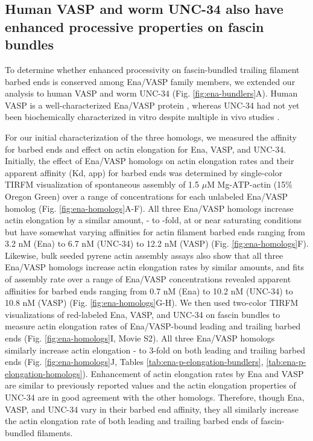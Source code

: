 \subsection{Human VASP and worm UNC-34 also have enhanced processive properties on fascin bundles}\label{vasp-unc34-processive}

To determine whether enhanced processivity on fascin-bundled trailing filament barbed ends is conserved among Ena/VASP family members, we extended our analysis to human VASP and worm UNC-34 (Fig. \ref{fig:ena-bundlers}A). Human VASP is a well-characterized Ena/VASP protein \citep{bachmann_evh2_1999,chereau_understanding_2006,breitsprecher_clustering_2008,pasic_ena/vasp_2008,hansen_vasp_2010}, whereas UNC-34 had not yet been biochemically characterized in vitro despite multiple in vivo studies \citep{sheffield_c._2007,fleming_role_2010,havrylenko_wave_2015}. 

For our initial characterization of the three homologs, we measured the affinity for barbed ends and effect on actin elongation for Ena, VASP, and UNC-34. Initially, the effect of Ena/VASP homologs on actin elongation rates and their apparent affinity (Kd, app) for barbed ends was determined by single-color TIRFM visualization of spontaneous assembly of 1.5 $\mu$M Mg-ATP-actin (15\% Oregon Green) over a range of concentrations for each unlabeled Ena/VASP homolog (Fig. \ref{fig:ena-homologs}A-F). All three Ena/VASP homologs increase actin elongation by a similar amount, - to -fold, at or near saturating conditions but have somewhat varying affinities for actin filament barbed ends ranging from 3.2 nM (Ena) to 6.7 nM (UNC-34) to 12.2 nM (VASP) (Fig. \ref{fig:ena-homologs}F). Likewise, bulk seeded pyrene actin assembly assays also show that all three Ena/VASP homologs increase actin elongation rates by similar amounts, and fits of assembly rate over a range of Ena/VASP concentrations revealed apparent affinities for barbed ends ranging from 0.7 nM (Ena) to 10.2 nM (UNC-34) to 10.8 nM (VASP) (Fig. \ref{fig:ena-homologs}G-H). We then used two-color TIRFM visualizations of red-labeled Ena, VASP, and UNC-34 on fascin bundles to measure actin elongation rates of Ena/VASP-bound leading and trailing barbed ends (Fig. \ref{fig:ena-homologs}I, Movie S2). All three Ena/VASP homologs similarly increase actin elongation - to 3-fold on both leading and trailing barbed ends (Fig. \ref{fig:ena-homologs}J, Tables \ref{tab:ena-p-elongation-bundlers}, \ref{tab:ena-p-elongation-homologs}). Enhancement of actin elongation rates by Ena and VASP are similar to previously reported values \citep{hansen_vasp_2010,winkelman_ena/vasp_2014,bruhmann_distinct_2017} and the actin elongation properties of UNC-34 are in good agreement with the other homologs. Therefore, though Ena, VASP, and UNC-34 vary in their barbed end affinity, they all similarly increase the actin elongation rate of both leading and trailing barbed ends of fascin-bundled filaments.

